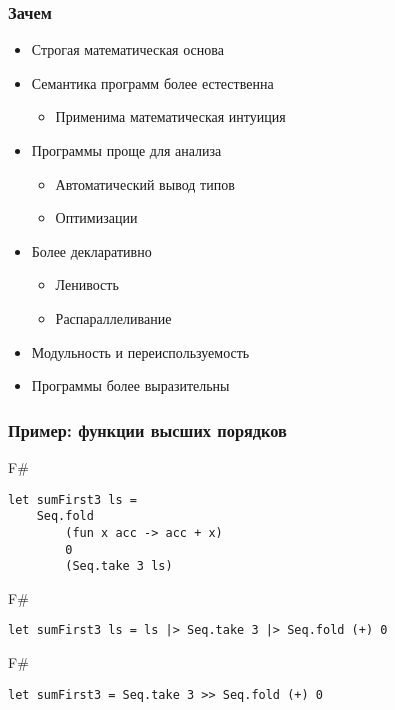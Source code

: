 \documentclass[xetex,mathserif,serif]{beamer}
\begin{document}
	\begin{frame}
		\frametitle{Зачем}
		\begin{itemize}
			\item Строгая математическая основа
			\item Семантика программ более естественна
			\begin{itemize}
				\item Применима математическая интуиция
			\end{itemize}
			\item Программы проще для анализа
			\begin{itemize}
				\item Автоматический вывод типов
				\item Оптимизации
			\end{itemize}
			\item Более декларативно
			\begin{itemize}
				\item Ленивость
				\item Распараллеливание
			\end{itemize}
			\item Модульность и переиспользуемость
			\item Программы более выразительны
		\end{itemize}
	\end{frame}
	
	\begin{frame}[fragile]
		\frametitle{Пример: функции высших порядков}
		\begin{exampleblock}{F\#}
			\begin{lstlisting}
let sumFirst3 ls = 
    Seq.fold 
        (fun x acc -> acc + x) 
        0 
        (Seq.take 3 ls)
            \end{lstlisting}
		\end{exampleblock}
		\begin{exampleblock}{F\#}
			\begin{lstlisting}
let sumFirst3 ls = ls |> Seq.take 3 |> Seq.fold (+) 0
            \end{lstlisting}
		\end{exampleblock}
		\begin{exampleblock}{F\#}
			\begin{lstlisting}
let sumFirst3 = Seq.take 3 >> Seq.fold (+) 0
            \end{lstlisting}
		\end{exampleblock}
\end{frame}
\end{document}
